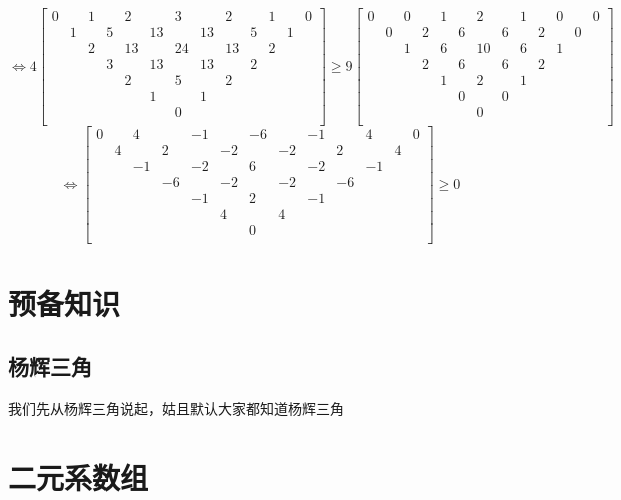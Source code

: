\documentclass[UTF8]{ctexart}
\begin{document}
$$\Leftrightarrow 
4\left[
\begin{smallmatrix}
	0& &1& &2& &3& &2& &1& &0\\
	&1& &5& &13& &13& &5& &1&\\
	& &2& &13& &24& &13& &2& &\\
	& & &3& &13& &13& &2& & &\\
	& & & &2& &5& &2& & & &\\
	& & & & &1& &1& & & & &\\
	& & & & & &0& & & & & &\\
\end{smallmatrix}
\right]\geq 9
\left[
\begin{smallmatrix}
	0& &0& &1& &2& &1& &0& &0\\
	&0& &2& &6& &6& &2& &0&\\
	& &1& &6& &10& &6& &1& &\\
	& & &2& &6& &6& &2& & &\\
	& & & &1& &2& &1& & & &\\
	& & & & &0& &0& & & & &\\
	& & & & & &0& & & & & &\\
\end{smallmatrix}
\right]
$$
$$\Leftrightarrow 
\left[
\begin{smallmatrix}
	0& &4& &-1& &-6& &-1& &4& &0\\
	&4& &2& &-2& &-2& &2& &4&\\
	& &-1& &-2& &6& &-2& &-1& &\\
	& & &-6& &-2& &-2& &-6& & &\\
	& & & &-1& &2& &-1& & & &\\
	& & & & &4& &4& & & & &\\
	& & & & & &0& & & & & &\\
\end{smallmatrix}
\right]\geq 0
$$

\newpage
\tableofcontents

\newpage

\section{预备知识} 
\subsection{杨辉三角}
我们先从杨辉三角说起，姑且默认大家都知道杨辉三角
\section{二元系数组}
\end{document}
